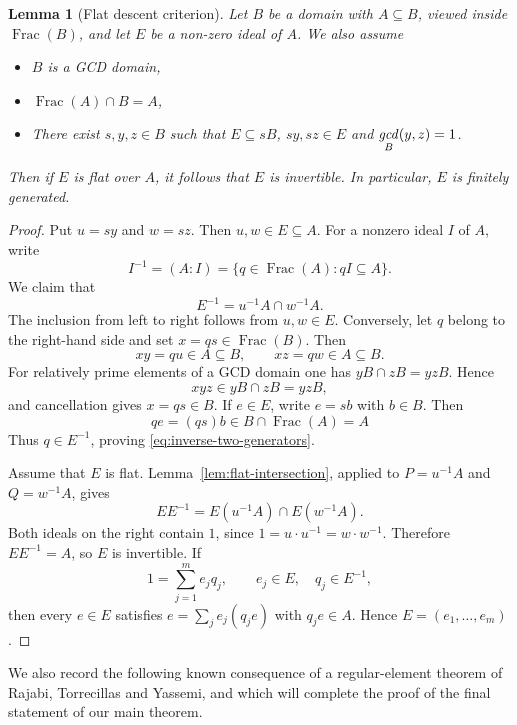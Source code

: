 \documentclass[12pt]{amsart}
\newtheorem{lemma}[theorem]{Lemma}
\theoremstyle{plain}
\newcommand{\Frac}{\operatorname{Frac}}
\begin{document}
\begin{lemma}[Flat descent criterion]\label{lem:flat-descent}
Let $B$ be a domain with $A\subseteq B$, viewed inside $\Frac(B)$, and let $E$ be a non-zero ideal of $A$. We also assume
\begin{itemize}
\item[(i)] $B$ is a GCD domain,

\item[(ii)] $\Frac(A)\cap B=A$,

\item[(iii)] There exist $s,y,z\in B$ such that $E\subseteq sB$, $sy,sz\in E$ and $\underset{B}{\text{\emph{gcd}}}(y,z)=1$.
\end{itemize}

\noindent Then if $E$ is flat over $A$, it follows that $E$ is invertible.  In particular, $E$ is finitely generated.
\end{lemma}

\begin{proof}
Put $u=sy$ and $w=sz$.  Then $u,w\in E\subseteq A$.  For a nonzero
ideal $I$ of $A$, write
\[
  I^{-1}=(A:I)
  =\{q\in\Frac(A):qI\subseteq A\}.
\]
We claim that
\begin{equation}\label{eq:inverse-two-generators}
  E^{-1}=u^{-1}A\cap w^{-1}A.
\end{equation}
The inclusion from left to right follows from $u,w\in E$.  Conversely,
let $q$ belong to the right-hand side and set $x=qs\in\Frac(B)$.  Then
\[
  xy=qu\in A\subseteq B,
  \qquad
  xz=qw\in A\subseteq B.
\]
For relatively prime elements of a GCD domain one has
$yB\cap zB=yzB$.  Hence
\[
  xyz\in yB\cap zB=yzB,
\]
and cancellation gives $x=qs\in B$.  If $e\in E$, write $e=sb$ with
$b\in B$.  Then
\[
  qe=(qs)b\in B\cap\Frac(A)=A
\]
Thus $q\in E^{-1}$, proving \eqref{eq:inverse-two-generators}.

Assume that $E$ is flat.  Lemma~\ref{lem:flat-intersection}, applied to
$P=u^{-1}A$ and $Q=w^{-1}A$, gives
\[
  EE^{-1}=E(u^{-1}A)\cap E(w^{-1}A).
\]
Both ideals on the right contain $1$, since
$1=u\cdot u^{-1}=w\cdot w^{-1}$.  Therefore $EE^{-1}=A$, so $E$ is
invertible.  If
\[
  1=\sum_{j=1}^m e_jq_j,
  \qquad e_j\in E,\quad q_j\in E^{-1},
\]
then every $e\in E$ satisfies
$e=\sum_j e_j(q_je)$ with $q_je\in A$.  Hence
$E=(e_1,\ldots,e_m)$.
\end{proof}


\noindent We also record the following known consequence of a regular-element theorem of Rajabi, Torrecillas and Yassemi, and which will complete the proof of the final statement of our main theorem. 
\end{document}
